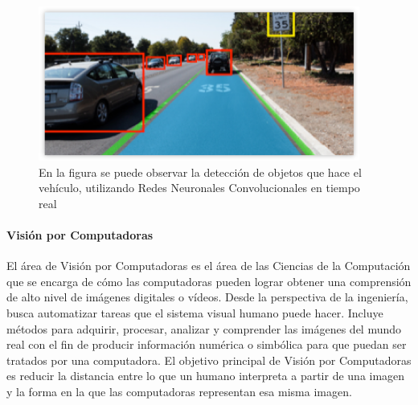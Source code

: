 \documentclass[a4paper,11pt,spanish]{book}
\begin{document}
    \begin{figure}[h]
      \includegraphics[width=0.9\linewidth]{./img/nvidia_car_detection.png}
      \caption{En la figura se puede observar la detección de objetos que hace el vehículo, utilizando Redes Neuronales Convolucionales en tiempo real}
      \label{fig:car_detection}
    \end{figure}
    \paragraph{Visión por Computadoras}
      El área de Visión por Computadoras es el área de las Ciencias de la Computación que se encarga de cómo las computadoras pueden lograr obtener una comprensión de alto nivel de imágenes digitales o vídeos.
      Desde la perspectiva de la ingeniería, busca automatizar tareas que el sistema visual humano puede hacer. Incluye métodos para adquirir, procesar, analizar y comprender las imágenes del mundo real
      con el fin de producir información numérica o simbólica para que puedan ser tratados por una computadora. El objetivo principal de Visión por Computadoras es reducir la distancia
      entre lo que un humano interpreta a partir de una imagen y la forma en la que las computadoras representan esa misma imagen.
\end{document}

